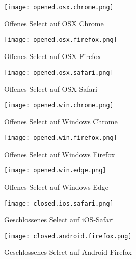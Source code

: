 
\begin{figure}[!htb]
    \centering
    \begin{minipage}[b]{0.28\textwidth}
        \centering
        \texttt{[image: opened.osx.chrome.png]}
        \caption{\centering Offenes Select auf OSX Chrome}
        \label{img:openedOsxChromeSelect}
    \end{minipage}
    \hfill
    \begin{minipage}[b]{0.28\textwidth}
        \centering
        \texttt{[image: opened.osx.firefox.png]}
        \caption{\centering Offenes Select auf OSX Firefox}
        \label{img:openedOsxFirefoxSelect}
    \end{minipage}
    \hfill
    \begin{minipage}[b]{0.28\textwidth}
        \centering
        \texttt{[image: opened.osx.safari.png]}
        \caption{\centering Offenes Select auf OSX Safari}
        \label{img:openedOsxSafariSelect}
    \end{minipage}
\end{figure}

\begin{figure}[!htb]
    \centering
    \begin{minipage}[b]{0.28\textwidth}
        \centering
        \texttt{[image: opened.win.chrome.png]}
        \caption{\centering Offenes Select auf Windows Chrome}
        \label{img:openedWinChromeSelect}
    \end{minipage}
    \hfill
    \begin{minipage}[b]{0.28\textwidth}
        \centering
        \texttt{[image: opened.win.firefox.png]}
        \caption{\centering Offenes Select auf Windows Firefox}
        \label{img:openedWinFirefoxSelect}
    \end{minipage}
    \hfill
    \begin{minipage}[b]{0.28\textwidth}
        \centering
        \texttt{[image: opened.win.edge.png]}
        \caption{\centering Offenes Select auf Windows Edge}
        \label{img:openedWinEdgeSelect}
    \end{minipage}
\end{figure}


\begin{figure}[!htb]
    \centering
    \begin{minipage}[b]{0.45\textwidth}
        \centering
        \texttt{[image: closed.ios.safari.png]}
        \caption{\centering Geschlossenes Select auf iOS-Safari}
        \label{img:closedIosSafariSelect}
    \end{minipage}
    \hfill
    \begin{minipage}[b]{0.45\textwidth}
        \centering
        \texttt{[image: closed.android.firefox.png]}
        \caption{\centering Geschlossenes Select auf Android-Firefox}
        \label{img:closedAndroidFirefoxSelect}
    \end{minipage}
\end{figure}

